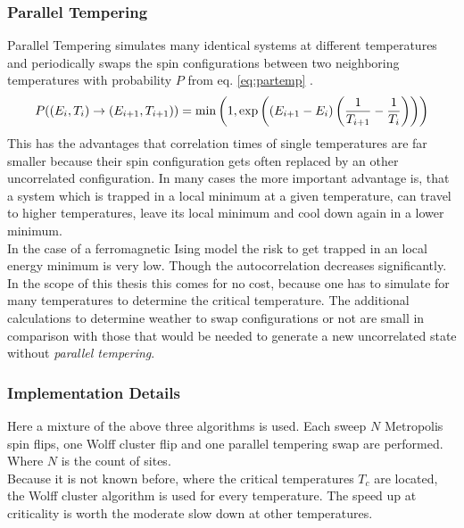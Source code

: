     \subsubsection{Parallel Tempering}
        Parallel Tempering\cite{ParallelTempering1986} simulates many identical systems at different
        temperatures and periodically swaps the spin configurations
        between two neighboring temperatures with probability \(P\) from
        eq. \eqref{eq:partemp} \cite[S. ??]{NewmanBarkema1999} \cite[S. 155ff]{Katzgraber2011}.
        \begin{equation}
            P((E_i,T_i) \to (E_{i+1},T_{i+1})) = \min\left(1,\exp\left(\left(E_{i+1}-E_i\right)\left(\frac{1}{T_{i+1}}-\frac{1}{T_i}\right)\right)\right)
            \label{eq:partemp}
        \end{equation}
        This has the advantages that correlation times of single
        temperatures are far smaller because their spin configuration
        gets often replaced by an other uncorrelated configuration. In
        many cases the more important advantage is, that a system which
        is trapped in a local minimum at a given temperature, can travel
        to higher temperatures, leave its local minimum and cool down
        again in a lower minimum.\\
        In the case of a ferromagnetic Ising model the risk to get trapped
        in an local energy minimum is very low. Though the autocorrelation
        decreases significantly. In the scope of this thesis this comes
        for no cost, because one has to simulate for many temperatures
        to determine the critical temperature. The additional calculations
        to determine weather to swap configurations or not are small in
        comparison with those that would be needed to generate a new
        uncorrelated state without \emph{parallel tempering}.

    \subsubsection{Implementation Details}
        Here a mixture of the above three algorithms is used.
        Each sweep \(N\) Metropolis spin flips, one Wolff cluster flip
        and one parallel tempering swap are performed. Where \(N\) is the
        count of sites.\\
        Because it is not known before, where the critical temperatures
        \(T_c\) are located, the Wolff cluster algorithm is used for
        every temperature. The speed up at criticality is worth the
        moderate slow down at other temperatures.

